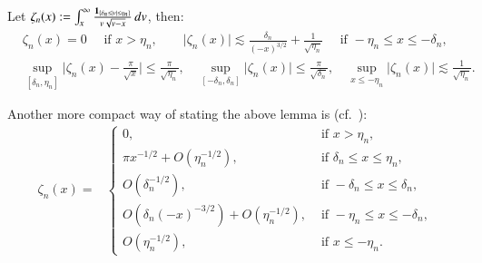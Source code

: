 \begin{lemma}\label{lemma: expansion GL}
    Let $\zeta_n(x):= \int_{x}^{\infty} \frac{\mathbf{1}_{\{ \delta_n \leq |v| \leq \eta_n \}}}{v \sqrt{v-x}} \, dv$, then:
    \begin{align*}
         &\zeta_n(x) = 0 \quad  \text { if } x>\eta_n, \quad \quad \bigg|\zeta_n(x) \bigg| \lesssim \frac{\delta_n}{(-x)^{3/2}} + \frac{1}{\sqrt{\eta_n}} \quad  \text { if }-\eta_n \leq x \leq-\delta_n,\\
         &\sup_{[\delta_n, \eta_n]} \bigg|\zeta_n(x) - \frac{\pi}{\sqrt{x}} \bigg| \leq \frac{\pi}{\sqrt{\eta_n}}, \quad  \sup_{[-\delta_n, \delta_n]} \bigg|\zeta_n(x)  \bigg| \leq \frac{\pi}{\sqrt{\delta_n}}, \quad  \sup_{x \leq -\eta_n}\bigg|\zeta_n(x) \bigg| \lesssim \frac{1}{\sqrt{\eta_n}}.
    \end{align*}
\end{lemma}
\begin{remark}
    Another more compact way of stating the above lemma is (cf.\ \cite{10}):
    \begin{align}
         \zeta_n(x) =& \begin{cases}0, & \text { if } x>\eta_n, \\ 
         \pi x^{-1/2} + O\left(\eta_n^{-1/2} \right), & \text { if } \delta_n \leq x \leq \eta_n, \\  O\left(\delta_n^{-1 / 2}\right), & \text { if }-\delta_n \leq x \leq \delta_n, \\ O\left(\delta_n(-x)^{-3 / 2}\right)+O\left(\eta_n^{-1 / 2}\right), & \text { if }-\eta_n \leq x \leq-\delta_n, \\ O\left(\eta_n^{-1 / 2}\right), & \text { if } x \leq-\eta_n .\end{cases}\label{eq: approximation xi}
    \end{align}
\end{remark}
